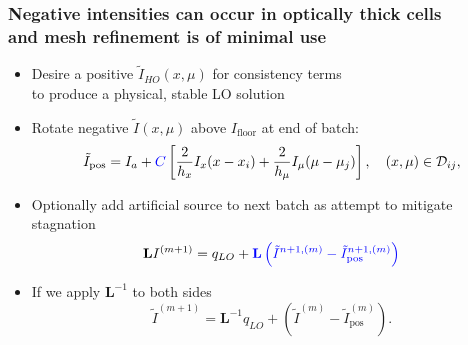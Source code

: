 \documentclass[xcolor=dvipsnames,hyperref={pdfpagelabels=false},unknownkeysallowed]{beamer}
\newcommand{\colb}[1]{{\color{blue} #1}}
\newcommand{\colG}[1]{{\color{Gray!110} #1}}
\newlength{\wideitemsep}
\let\olditem\item
\renewcommand{\item}{\setlength{\itemsep}{\wideitemsep}\olditem}
\newcommand{\B}[1]{\ensuremath{\mathbf{#1}}}
\begin{document}
\begin{frame}
    \frametitle{Negative intensities can occur in optically thick cells \\
    \colG{and mesh refinement is of minimal use}}

    {\addtolength\wideitemsep{5pt}
    \begin{itemize}
        \item  Desire a positive $\tilde I_{HO}(x,\mu)$ for consistency terms \\
            \colG{to produce a physical, stable LO solution}
        \item \colb{Rotate} negative $\tilde I(x,\mu)$ above $I_{\text{floor}}$  at end of batch:
\begin{equation*}
    \tilde I_{\text{pos}} = I_{a} + \colb{C}\left[\frac{2}{h_x}I_x(x-x_i) +
    \frac{2}{h_\mu}I_\mu(\mu-\mu_j)\right],\quad     (x,\mu) \in \mathcal{D}_{ij},
\end{equation*}\pause
        \item Optionally add artificial \colb{source} to next batch as attempt to mitigate stagnation
            \begin{equation*}
                \B L I^{(m+1)} = q_{LO} + \colb{ \mathbf{L}\left(\tilde{I}^{n+1,(m)} -
                \tilde{I}^{n+1,(m)}_{\text{pos}}\right)}
            \end{equation*}
        \item[] If we apply $\B L^{-1}$ to both sides
\begin{equation*}
    \tilde I^{(m+1)} = \B L^{-1} q_{LO} + (\tilde{I}^{(m)} -
    \tilde{I}^{(m)}_{\text{pos}}).
\end{equation*}
    \end{itemize}
}
\end{frame}
\end{document}
